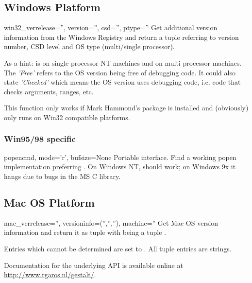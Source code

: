 \subsection{Windows Platform}

\begin{funcdesc}{win32_ver}{release='', version='', csd='', ptype=''}
  Get additional version information from the Windows Registry
  and return a tuple 
  referring to version number, CSD level and OS type (multi/single
  processor).

  As a hint:  is  on single
  processor NT machines and  on multi
  processor machines. The \emph{'Free'} refers to the OS version being
  free of debugging code. It could also state \emph{'Checked'} which
  means the OS version uses debugging code, i.e. code that
  checks arguments, ranges, etc.

  \begin{notice}[note]
    This function only works if Mark Hammond's 
    package is installed and (obviously) only runs on Win32
    compatible platforms.
  \end{notice}
\end{funcdesc}

\subsubsection{Win95/98 specific}

\begin{funcdesc}{popen}{cmd, mode='r', bufsize=None}
  Portable  interface.  Find a working popen
  implementation preferring .  On Windows
  NT,  should work; on Windows 9x it hangs
  due to bugs in the MS C library.
\end{funcdesc}


\subsection{Mac OS Platform}

\begin{funcdesc}{mac_ver}{release='', versioninfo=('','',''), machine=''}
  Get Mac OS version information and return it as tuple
   with
   being a tuple .

  Entries which cannot be determined are set to .  All tuple
  entries are strings.

  Documentation for the underlying  API is
  available online at \url{http://www.rgaros.nl/gestalt/}.
\end{funcdesc}


